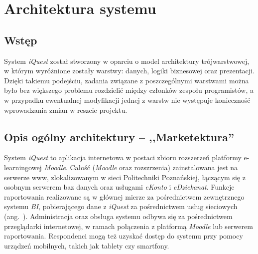 \chapter{Architektura systemu}
\label{Chapter5}

\section{Wstęp}
\label{Chapter51}

System \textit{iQuest} został stworzony w oparciu o model architektury trójwarstwowej, w którym wyróżnione zostały warstwy: danych, logiki biznesowej oraz prezentacji. Dzięki takiemu podejściu, zadania związane z poszczególnymi warstwami można było bez większego problemu rozdzielić między członków zespołu programistów, a w przypadku ewentualnej modyfikacji jednej z warstw nie występuje konieczność wprowadzania zmian w reszcie projektu.

\section{Opis ogólny architektury -- ,,Marketektura''}
\label{Chapter52}

System \textit{iQuest} to aplikacja internetowa w postaci zbioru rozszerzeń platformy e-learningowej \textit{Moodle}. Całość (\textit{Moodle} oraz rozszrzenia) zainstalowana jest na serwerze www, zlokalizowanym w sieci Politechniki Poznańskiej, łączącym się z osobnym serwerem baz danych oraz usługami \textit{eKonto} i \textit{eDziekanat}. Funkcje raportowania realizowane są w głównej mierze za pośrednictwem zewnętrznego systemu \textit{BI}, pobierającego dane z \textit{iQuest} za pośrednictwem usług sieciowych (ang.~). Administracja oraz obsługa systemu odbywa się za pośrednictwem przeglądarki internetowej, w ramach połączenia z platformą \textit{Moodle} lub serwerem raportowania. Respondenci mogą też uzyskać dostęp do systemu przy pomocy urządzeń mobilnych, takich jak tablety czy smartfony.

